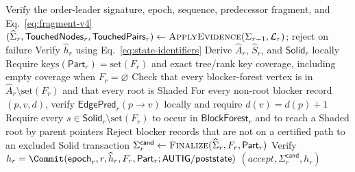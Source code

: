 \begin{algorithm}[h!]
\caption{Verify an Authenticated AUTIG Transition}
\label{alg:verification-v4}
\footnotesize
{}
Verify the order-leader signature, epoch, sequence, predecessor fragment,
and Eq.~\eqref{eq:fragment-v4}\;
$(\widehat\Sigma_r,\mathsf{TouchedNodes}_r,
  \mathsf{TouchedPairs}_r)\gets
 \textsc{ApplyEvidence}(\Sigma_{r-1},\mathcal L_r)$; reject on failure\;
Verify $\widehat h_r$ using Eq.~\eqref{eq:state-identifiers}\;
Derive $\widehat A_r$, $\widehat S_r$, and $\mathsf{Solid}_r$ locally\;
Require $\mathrm{keys}(\mathsf{Part}_r)=\mathrm{set}(F_r)$ and exact
tree/rank key coverage, including empty coverage when $F_r=\varnothing$\;
Check that every blocker-forest vertex is in
$\widehat A_r\setminus\mathrm{set}(F_r)$ and that every root is Shaded\;
For every non-root blocker record $(p,v,d)$, verify
$\mathsf{EdgePred}_r(p\to v)$ locally and require
$d(v)=d(p)+1$\;
Require every $s\in\mathsf{Solid}_r\setminus\mathrm{set}(F_r)$ to occur in
$\mathsf{BlockForest}_r$ and to reach a Shaded root by parent pointers\;
Reject blocker records that are not on a certified path to an excluded Solid
transaction\;
$\Sigma_r^{\mathsf{cand}}\gets
  \textsc{Finalize}(\widehat\Sigma_r,F_r,\mathsf{Part}_r)$\;
Verify $h_r=\Commit(\mathsf{epoch}_r,r,\widehat h_r,F_r,\mathsf{Part}_r;
                    \mathsf{AUTIG/poststate})$\;
\KwRet $(accept,\Sigma_r^{\mathsf{cand}},h_r)$
\end{algorithm}

